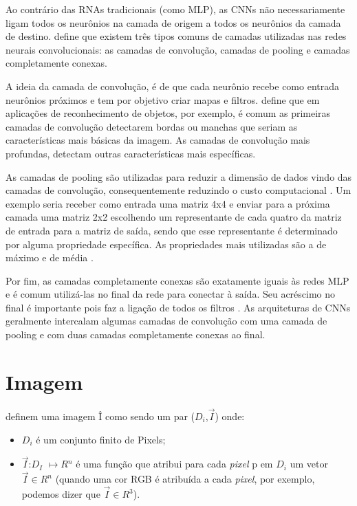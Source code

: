 Ao contrário das \ac{RNA}s tradicionais (como \ac{MLP}), as \ac{CNN}s não necessariamente ligam todos os neurônios na camada de origem a todos os neurônios da camada de destino.  define que existem três tipos comuns de camadas utilizadas nas redes neurais convolucionais: as camadas de convolução, camadas de pooling e camadas completamente conexas.

A ideia da camada de convolução, é de que cada neurônio recebe como entrada neurônios próximos e tem por objetivo criar mapas e filtros.  define que em aplicações de reconhecimento de objetos, por exemplo, é comum as primeiras camadas de convolução detectarem bordas ou manchas que seriam as características mais básicas da imagem. As camadas de convolução mais profundas, detectam outras características mais específicas.

As camadas de pooling são utilizadas para reduzir a dimensão de dados vindo das camadas de convolução, consequentemente reduzindo o custo computacional \cite{ferreira-2017}. Um exemplo seria receber como entrada uma matriz 4x4 e enviar para a próxima camada uma matriz 2x2 escolhendo um representante de cada quatro da matriz de entrada para a matriz de saída, sendo que esse representante é determinado por alguma propriedade específica. As propriedades mais utilizadas são a de máximo e de média \cite{ferreira-2017}.

Por fim, as camadas completamente conexas são exatamente iguais às redes MLP e é comum utilizá-las no final da rede para conectar à saída. Seu acréscimo no final é importante pois faz a ligação de todos os filtros \cite{ferreira-2017}. As arquiteturas de \ac{CNN}s geralmente intercalam algumas camadas de convolução com uma camada de pooling e com duas camadas completamente conexas ao final.

\section{Imagem}
\label{secao:2:4}

 definem uma imagem Î como sendo um par ($D_i$,$\vec{I}$) onde:

\begin{itemize}
	\item $D_i$ é um conjunto finito de \ac{Pixels};
	\item $\vec{I}$:$D_I$ $\mapsto $${R}$$^n$ é uma função que atribui para cada \textit{pixel} p em $D_i$ um vetor $\vec{I} \in R^n$ (quando uma cor RGB é atribuída a cada \textit{pixel}, por exemplo, podemos dizer que $\vec{I} \in R^3$).
	
\end{itemize}

